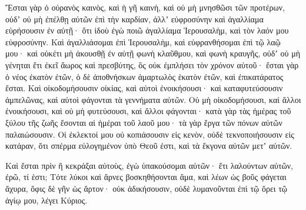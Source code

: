 {\par }{\PP {}Ἔσται γὰρ ὁ οὐρανὸς καινὸς, καὶ ἡ γῆ καινὴ, καὶ οὐ μὴ μνησθῶσι τῶν προτέρων, οὐδʼ οὐ μὴ ἐπέλθῃ αὐτῶν ἐπὶ τὴν καρδίαν,
ἀλλʼ εὐφροσύνην καὶ ἀγαλλίαμα εὑρήσουσιν ἐν αὐτῇ· ὅτι ἰδοὺ ἐγὼ ποιῶ ἀγαλλίαμα Ἱερουσαλὴμ, καὶ τὸν λαόν μου εὐφροσύνην.
Καὶ ἀγαλλιάσομαι ἐπὶ Ἱερουσαλὴμ, καὶ εὐφρανθήσομαι ἐπὶ τῷ λαῷ μου· καὶ οὐκέτι μὴ ἀκουσθῇ ἐν αὐτῇ φωνὴ κλαῦθμου, καὶ φωνὴ κραυγῆς,
οὐδʼ οὐ μὴ γένηται ἔτι ἐκεῖ ἄωρος καὶ πρεσβύτης, ὃς οὐκ ἐμπλήσει τὸν χρόνον αὐτοῦ· ἔσται γὰρ ὁ νέος ἐκατὸν ἐτῶν, ὁ δὲ ἀποθνήσκων ἁμαρτωλὸς ἑκατὸν ἐτῶν, καὶ ἐπικατάρατος ἔσται.
Καὶ οἰκοδομήσουσιν οἰκίας, καὶ αὐτοὶ ἐνοικήσουσι· καὶ καταφυτεύσουσιν ἀμπελῶνας, καὶ αὐτοὶ φάγονται τὰ γεννήματα αὐτῶν.
Οὐ μὴ οἰκοδομήσουσι, καὶ ἄλλοι ἐνοικήσουσι, καὶ οὐ μὴ φυτεύσουσι, καὶ ἄλλοι φάγονται· κατὰ γὰρ τὰς ἡμέρας τοῦ ξύλου τῆς ζωῆς ἔσονται αἱ ἡμέραι τοῦ λαοῦ μου· τὰ γὰρ ἔργα τῶν πόνων αὐτῶν παλαιώσουσιν.
Οἱ ἐκλεκτοί μου οὐ κοπιάσουσιν εἰς κενὸν, οὐδὲ τεκνοποιήσουσιν εἰς κατάραν, ὅτι σπέρμα εὐλογημένον ὑπὸ Θεοῦ ἐστι, καὶ τὰ ἔκγονα αὐτῶν μετʼ αὐτῶν.
\par }{\PP {}Καὶ ἔσται πρὶν ἢ κεκράξαι αὐτοὺς, ἐγὼ ὑπακούσομαι αὐτῶν· ἔτι λαλούντων αὐτῶν, ἐρῶ, τί ἐστι;
Τότε λύκοι καὶ ἄρνες βοσκηθήσονται ἅμα, καὶ λέων ὡς βοῦς φάγεται ἄχυρα, ὄφις δὲ γῆν ὡς ἄρτον· οὐκ ἀδικήσουσιν, οὐδὲ λυμανοῦνται ἐπὶ τῷ ὄρει τῷ ἁγίῳ μου, λέγει Κύριος.

}
